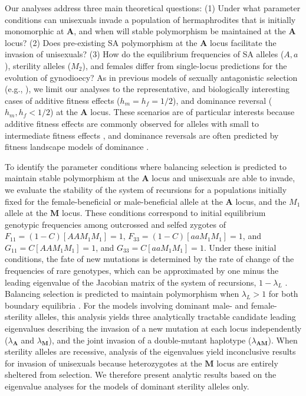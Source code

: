 \documentclass[9pt,twocolumn,twoside,lineno]{gsajnl}
\begin{document}
Our analyses address three main theoretical questions: (1) Under what parameter conditions can unisexuals invade a population of hermaphrodites that is initially monomorphic at $\mathbf{A}$, and when will stable polymorphism be maintained at the $\mathbf{A}$ locus? (2) Does pre-existing SA polymorphism at the $\mathbf{A}$ locus facilitate the invasion of unisexuals? (3) How do the equilibrium frequencies of SA alleles ($A,a$), sterility alleles ($M_2$), and females differ from single-locus predictions for the evolution of gynodioecy? As in previous models of sexually antagonistic selection (e.g., \citealp{Kidwell1977,Prout2000,JordanConnallon2014}), we limit our analyses to the representative, and biologically interesting cases of additive fitness effects ($h_m = h_f = 1/2$), and dominance reversal ($h_m, h_f < 1/2$) at the $\mathbf{A}$ locus. These scenarios are of particular interests because additive fitness effects are commonly observed for alleles with small to intermediate fitness effects \citep{Agrawal2011}, and dominance reversals are often predicted by fitness landscape models of dominance \citep{Manna2011, ConnallonClark2014}.

To identify the parameter conditions where balancing selection is predicted to maintain stable polymorphism at the $\mathbf{A}$ locus and unisexuals are able to invade, we evaluate the stability of the system of recursions for a populations initially fixed for the female-beneficial or male-beneficial allele at the $\mathbf{A}$ locus, and the $M_1$ allele at the $\mathbf{M}$ locus. These conditions correspond to initial equilibrium genotypic frequencies among outcrossed and selfed zygotes of $F_{11} = (1 - C) [AAM_1M_1] = 1$, $F_{33} = (1 - C) [aaM_1M_1] = 1$, and $G_{11} = C [AAM_1M_1] = 1$, and $G_{33} = C [aaM_1M_1] = 1$. Under these initial conditions, the fate of new mutations is determined by the rate of change of the frequencies of rare genotypes, which can be approximated by one minus the leading eigenvalue of the Jacobian matrix of the system of recursions, $1 - \lambda_L$ \citep{OttoDay2007}. Balancing selection is predicted to maintain polymorphism when $\lambda_L > 1$ for both boundary equilibria \citep{Prout1968,OttoDay2007}. For the models involving dominant male- and female-sterility alleles, this analysis yields three analytically tractable candidate leading eigenvalues describing the invasion of a new mutation at each locus independently ($\lambda_\mathbf{A}$ and $\lambda_\mathbf{M}$), and the joint invasion of a double-mutant haplotype ($\lambda_\mathbf{AM}$). When sterility alleles are recessive, analysis of the eigenvalues yield inconclusive results for invasion of unisexuals because heterozygotes at the $\mathbf{M}$ locus are entirely sheltered from selection. We therefore present analytic results based on the eigenvalue analyses for the models of dominant sterility alleles only.
\end{document}
